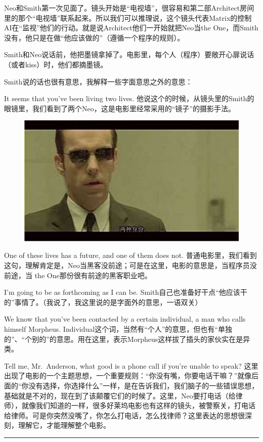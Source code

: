 \documentclass[UTF8]{ctexart}
\newcommand{\myparsep}{\noindent \rule[0.5ex]{\linewidth}{1pt}}
\begin{document}
Neo和Smith第一次见面了。镜头开始是“电视墙”，很容易和第二部Architect房间里的那个“电视墙”联系起来。所以我们可以推理说，这个镜头代表Matrix的控制AI在“监视”他们的行动。就是说Architect他们一开始就把Neo当the One，而Smith没有，他只是在做“他应该做的”（遵循一个程序的规则）。

Smith和Neo说话前，他把墨镜拿掉了。电影里，每个人（程序）要敞开心扉说话（或者kiss）时，他们都摘墨镜。

Smith说的话也很有意思，我解释一些字面意思之外的意思：

It seems that you've been living two lives. 他说这个的时候，从镜头里的Smith的眼镜里，我们看到了两个Neo，这是电影里经常采用的“镜子”的摄影手法。

\begin{figure}[htb]
\centering
\includegraphics[width=0.5\linewidth]{fig/read_Matrix-16}
\end{figure}

One of these lives has a future, and one of them does not. 普通电影里，我们看到这句，理解肯定是，Neo当黑客没前途；可是在这里，电影的意思是，当程序员没前途，当 the One那份很有前途的黑客职业吧。

I'm going to be as forthcoming as I can be. Smith自己也准备好干点“他应该干的”事情了。（我说了，我这里说的是字面外的意思，一语双关）

We know that you've been contacted by a certain individual, a man who calls himself Morpheus. Individual这个词，当然有“个人”的意思，但也有“单独的”、“个别的”的意思。用在这里，表示Morpheus这样拔了插头的家伙实在是异类。

Tell me, Mr.~Anderson, what good is a phone call if you're unable to speak? 这里出现了电影的一个主题思想，一个重要规则：“你没有嘴，你要电话干嘛？”就像后面的“你没有选择，你选择什么”一样，是在告诉我们，我们脑子的一些错误思想，基础就是不对的，现在到了该颠覆它们的时候了。这里，Neo要打电话（给律师），就像我们知道的一样，很多好莱坞电影也有这样的镜头，被警察关，打电话给律师。可是你突然没嘴了，你怎么打电话，怎么找律师？这里表达的思想很深刻，理解它，才能理解整个电影。

\myparsep
\end{document}
